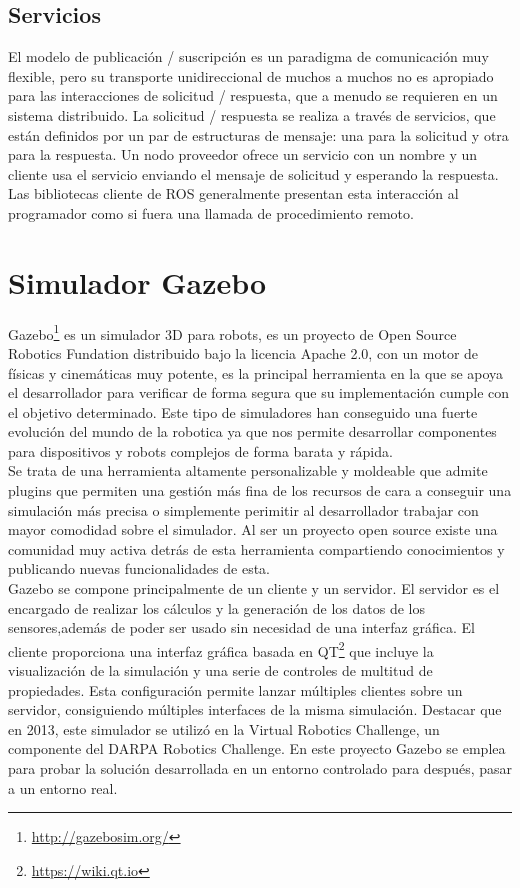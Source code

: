 \subsection{Servicios}
El modelo de publicación / suscripción es un paradigma de comunicación muy flexible, pero su transporte unidireccional de muchos a muchos no es apropiado para las interacciones de solicitud / respuesta, que a menudo se requieren en un sistema distribuido. La solicitud / respuesta se realiza a través de servicios, que están definidos por un par de estructuras de mensaje: una para la solicitud y otra para la respuesta. Un nodo proveedor ofrece un servicio con un nombre y un cliente usa el servicio enviando el mensaje de solicitud y esperando la respuesta. Las bibliotecas cliente de ROS generalmente presentan esta interacción al programador como si fuera una llamada de procedimiento remoto.\\

\section{Simulador Gazebo}
\label{sec:gazebo}
Gazebo\footnote{\url{http://gazebosim.org/}} es un simulador 3D para robots, es un proyecto de Open Source Robotics Fundation distribuido bajo la licencia Apache 2.0, con un motor de físicas y cinemáticas muy potente, es la principal herramienta en la que se apoya el desarrollador para verificar de forma segura que su implementación cumple con el objetivo determinado. Este tipo de simuladores han conseguido una fuerte evolución del mundo de la robotica ya que nos permite desarrollar componentes para dispositivos y robots complejos de forma barata y rápida.\\

Se trata de una herramienta altamente personalizable y moldeable que admite plugins que permiten una gestión más fina de los recursos de cara a conseguir una simulación más precisa o simplemente perimitir al desarrollador trabajar con mayor comodidad sobre el simulador.
Al ser un proyecto open source existe una comunidad muy activa detrás de esta herramienta compartiendo conocimientos y publicando nuevas funcionalidades de esta.\\

Gazebo se compone principalmente de un cliente y un servidor. El servidor es el encargado de realizar los cálculos y la generación de los datos de los sensores,además de poder ser usado sin necesidad de una interfaz gráfica.
El cliente proporciona una interfaz gráfica basada en QT\footnote{\url{https://wiki.qt.io}} que incluye la visualización de la simulación y una serie de controles de multitud de propiedades. Esta configuración permite lanzar múltiples clientes sobre un servidor, consiguiendo múltiples interfaces de la misma simulación.
Destacar que en 2013, este simulador se utilizó en la Virtual Robotics Challenge, un componente del DARPA Robotics Challenge. En este proyecto Gazebo se emplea para probar la solución desarrollada en un entorno controlado para después, pasar a un entorno real. \\

